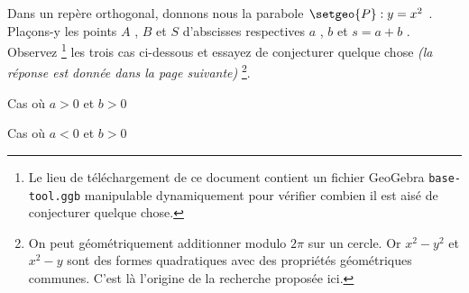 Dans un repère orthogonal, donnons nous la parabole $\setgeo{P} : y = x^2$ . Plaçons-y les points $A$ , $B$ et $S$ d'abscisses respectives $a$ , $b$ et  $s = a + b$ .
Observez
\footnote{
	Le lieu de téléchargement de ce document contient un fichier GeoGebra \texttt{base-tool.ggb} manipulable dynamiquement pour vérifier combien il est aisé de conjecturer quelque chose.
}
les trois cas ci-dessous et essayez de conjecturer quelque chose \emph{(la réponse est donnée dans la page suivante)}
\footnote{
	On peut géométriquement additionner modulo $2 \pi$ sur un cercle.
	Or $x^2 - y^2$ et $x^2 - y$ sont des formes quadratiques avec des propriétés géométriques communes.
	C'est là l'origine de la recherche proposée ici.
}.


\vspace{2.5em}

\begin{multicols}{2}
	\center
	\footnotesize
	\itshape
	
	
	\smallskip
	Cas où $a > 0$ et $b > 0$

	\columnbreak
	
	
	\smallskip
	Cas où $a < 0$ et $b > 0$
\end{multicols}
	
